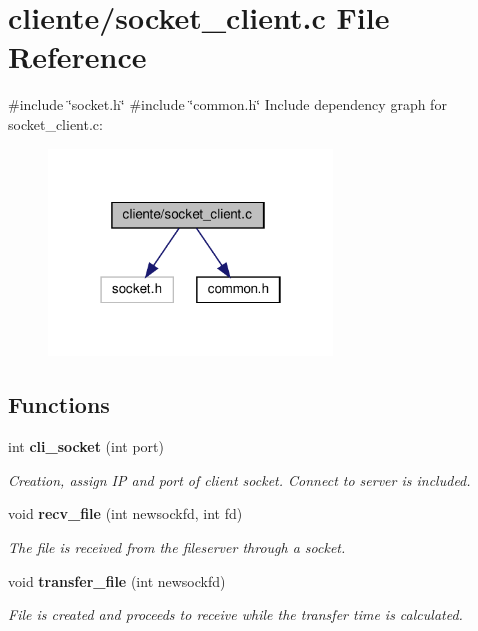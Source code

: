 \section{cliente/socket\+\_\+client.c File Reference}
\label{socket__client_8c}
{\ttfamily \#include \char`\"{}socket.\+h\char`\"{}}\newline
{\ttfamily \#include \char`\"{}common.\+h\char`\"{}}\newline
Include dependency graph for socket\+\_\+client.\+c\+:
\nopagebreak
\begin{figure}[H]
\begin{center}
\leavevmode
\includegraphics[width=214pt]{socket__client_8c__incl}
\end{center}
\end{figure}
\subsection*{Functions}
\begin{DoxyCompactItemize}
\item 
int \textbf{ cli\+\_\+socket} (int port)
\begin{DoxyCompactList}\small\item\em Creation, assign IP and port of client socket. Connect to server is included. \end{DoxyCompactList}\item 
void \textbf{ recv\+\_\+file} (int newsockfd, int fd)
\begin{DoxyCompactList}\small\item\em The file is received from the fileserver through a socket. \end{DoxyCompactList}\item 
void \textbf{ transfer\+\_\+file} (int newsockfd)
\begin{DoxyCompactList}\small\item\em File is created and proceeds to receive while the transfer time is calculated. \end{DoxyCompactList}\end{DoxyCompactItemize}


